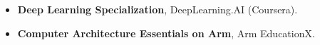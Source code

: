 \begin{itemize}
    \item \textbf{Deep Learning Specialization}, DeepLearning.AI (Coursera).
    \item \textbf{Computer Architecture Essentials on Arm}, Arm EducationX.
\end{itemize}
